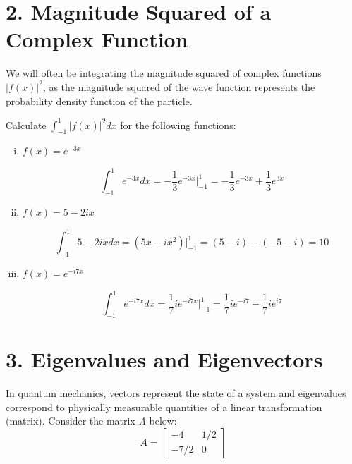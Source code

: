 \documentclass[10pt,letterpaper]{article}
\begin{document}
\section*{2. Magnitude Squared of a Complex Function}
We will often be integrating the magnitude squared of complex functions $|f(x)|^{2}$, as the magnitude squared of the wave function represents the probability density function of the particle.

\noindent Calculate $\int_{-1}^{1} |f(x)|^{2}dx$ for the following functions:

\begin{enumerate}[i)]
\item $f(x) = e^{-3x}$

\color{violet}
$$\int_{-1}^{1} e^{-3x}dx = -\frac{1}{3}e^{-3x} \vert_{-1}^{1} = -\frac{1}{3}e^{-3x} + \frac{1}{3}e^{3x}$$
\color{black}

\item $f(x) = 5 - 2ix$

\color{violet}
$$\int_{-1}^{1} 5 - 2ixdx = ( 5x - ix^{2})\vert_{-1}^{1} = (5 - i) - (-5 - i) = 10$$
\color{black}

\item $f(x) = e^{-i7x}$

\color{violet}
$$\int_{-1}^{1} e^{-i7x}dx = \frac{1}{7}ie^{-i7x}\vert_{-1}^{1} = \frac{1}{7}ie^{-i7} - \frac{1}{7}ie^{i7}$$
\color{black}
\end{enumerate}

\section*{3. Eigenvalues and Eigenvectors}
In quantum mechanics, vectors represent the state of a system and eigenvalues correspond to physically measurable quantities of a linear transformation (matrix). Consider the matrix \textit{A} below:
$$A = \begin{bmatrix}
-4 & 1/2 \\
-7/2 & 0
\end{bmatrix}$$
\end{document}
